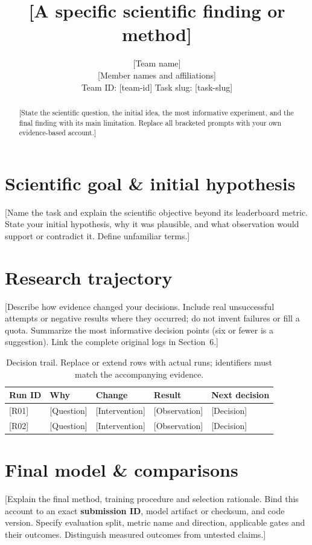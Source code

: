 \documentclass{article}
\title{[A specific scientific finding or method]}
\author{[Team name] \\ {[Member names and affiliations]}
\\ Team ID: [team-id] \quad Task slug: [task-slug]}
\begin{document}
\maketitle
\begin{abstract}
[State the scientific question, the initial idea, the most informative experiment,
and the final finding with its main limitation. Replace all bracketed prompts
with your own evidence-based account.]
\end{abstract}

\section{Scientific goal \& initial hypothesis}
[Name the task and explain the scientific objective beyond its leaderboard metric.
State your initial hypothesis, why it was plausible, and what observation would
support or contradict it. Define unfamiliar terms.]

\section{Research trajectory}
[Describe how evidence changed your decisions. Include real unsuccessful attempts
or negative results where they occurred; do not invent failures or fill a quota.
Summarize the most informative decision points (six or fewer is a suggestion).
Link the complete original logs in Section~6.]

\begin{table}[ht]
\caption{Decision trail. Replace or extend rows with actual runs; identifiers must
match the accompanying evidence.}
\label{tab:trajectory}
\centering
\begin{tabularx}{\textwidth}{@{}lXXXX@{}}
\toprule
Run ID & Why & Change & Result & Next decision \\
\midrule
{[R01]} & [Question] & [Intervention] & [Observation] & [Decision] \\
{[R02]} & [Question] & [Intervention] & [Observation] & [Decision] \\
\bottomrule
\end{tabularx}
\end{table}

\section{Final model \& comparisons}
[Explain the final method, training procedure and selection rationale.
Bind this account to an exact \textbf{submission ID}, model artifact or checksum,
and code version. Specify evaluation split, metric name and direction, applicable
gates and their outcomes. Distinguish measured outcomes from untested claims.]
\end{document}
